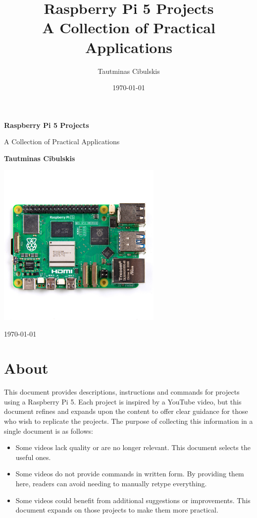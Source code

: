 \documentclass[a4paper,12pt]{article}
\title{\textbf{Raspberry Pi 5 Projects} \\ \Large A Collection of Practical Applications}
\author{Tautminas Cibulskis}
\date{\today}
\begin{document}
\begin{titlepage}
    \centering
    \vspace*{2cm}
    {\Huge \textbf{Raspberry Pi 5 Projects} \par}
    \vspace{0.5cm}
    {\Large A Collection of Practical Applications\par}
    \vspace{2cm}
    {\Large \textbf{Tautminas Cibulskis} \par}
    \vspace{1.5cm}
    \includegraphics[width=0.6\textwidth]{raspberry-pi-5.jpg}
    \vfill
    {\large \today\par}
\end{titlepage}

\renewcommand{\cftsecleader}{\cftdotfill{\cftdotsep}}

\tableofcontents

\section*{About}  

This document provides descriptions, instructions and commands for projects using a Raspberry Pi 5. Each project is inspired by a YouTube video, but this document refines and expands upon the content to offer clear guidance for those who wish to replicate the projects. The purpose of collecting this information in a single document is as follows:

\begin{itemize}
\item Some videos lack quality or are no longer relevant. This document selects the useful ones.
\item Some videos do not provide commands in written form. By providing them here, readers can avoid needing to manually retype everything.
\item Some videos could benefit from additional suggestions or improvements. This document expands on those projects to make them more practical.
\end{itemize}
\end{document}
